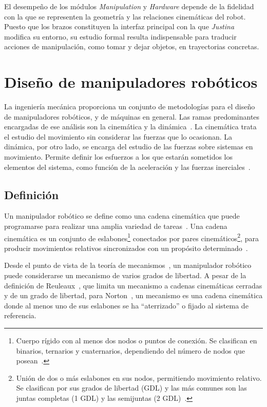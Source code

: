El desempeño de los módulos \emph{Manipulation} y \emph{Hardware} depende de la fidelidad con la que se representen la geometría y las relaciones cinemáticas del robot. Puesto que los brazos constituyen la interfaz principal con la que \emph{Justina} modifica su entorno, su estudio formal resulta indispensable para traducir acciones de manipulación, como tomar y dejar objetos, en trayectorias concretas.

\section{Diseño de manipuladores robóticos}
La ingeniería mecánica proporciona un conjunto de metodologías para el diseño de manipuladores robóticos, y de máquinas en general. Las ramas predominantes encargadas de ese análisis son la cinemática y la dinámica~\cite{craig}. La cinemática trata el estudio del movimiento sin considerar las fuerzas que lo ocasionan. La dinámica, por otro lado, se encarga del estudio de las fuerzas sobre sistemas en movimiento. Permite definir los esfuerzos a los que estarán sometidos los elementos del sistema, como función de la aceleración y las fuerzas inerciales~\cite{norton}.

\subsection{Definición}
Un manipulador robótico se define como una cadena cinemática que puede programarse para realizar una amplia variedad de tareas~\cite{craig}. Una cadena cinemática es un conjunto de eslabones\footnote{Cuerpo rígido con al menos dos nodos o puntos de conexión. Se clasifican en binarios, ternarios y cuaternarios, dependiendo del número de nodos que posean~\cite{norton}.} conectados por pares cinemáticos\footnote{Unión de dos o más eslabones en sus nodos, permitiendo movimiento relativo. Se clasifican por sus grados de libertad (GDL) y las más comunes son las juntas completas (1 GDL) y las semijuntas (2 GDL)~\cite{norton}.}, para producir movimientos relativos sincronizados con un propósito determinado~\cite{craig}.

Desde el punto de vista de la teoría de mecanismos~\cite{norton}, un manipulador robótico puede considerarse un mecanismo de varios grados de libertad. A pesar de la definición de Reuleaux~\cite{reuleaux}, que limita un mecanismo a cadenas cinemáticas cerradas y de un grado de libertad, para Norton~\cite{norton}, un mecanismo es una cadena cinemática donde al menos uno de sus eslabones se ha ``aterrizado'' o fijado al sistema de referencia.

